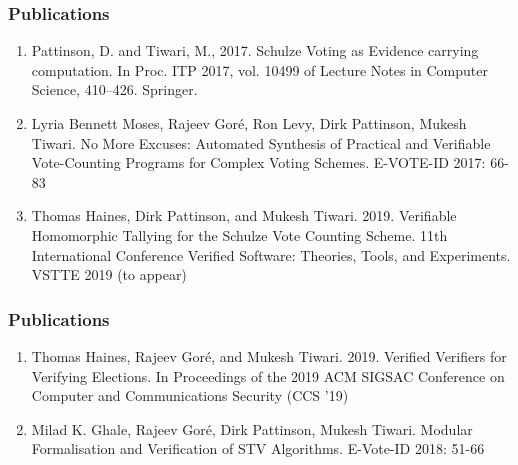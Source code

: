 \documentclass{beamer}
\begin{document}
\begin{frame}
\frametitle{Publications}
\begin{enumerate}
	\item Pattinson, D. and Tiwari, M., 2017. Schulze Voting as Evidence carrying computation. In Proc. 
	ITP 2017, vol. 10499 of Lecture Notes in Computer Science, 410–426. Springer. 
	\item Lyria Bennett Moses, Rajeev Goré, Ron Levy, Dirk Pattinson, Mukesh Tiwari.
	No More Excuses: Automated Synthesis of Practical and Verifiable Vote-Counting Programs for Complex 
	Voting 	Schemes. E-VOTE-ID 2017: 66-83
	\item Thomas Haines, Dirk Pattinson, and Mukesh Tiwari. 2019. 
	  Verifiable Homomorphic Tallying for the Schulze Vote Counting Scheme. 
	  11th International Conference Verified Software: Theories, Tools, and Experiments. 
      VSTTE 2019 (to appear)	
	\end{enumerate}
\end{frame}

\begin{frame}
\frametitle{Publications}
\begin{enumerate}
	 
	\item Thomas Haines, Rajeev Goré, and Mukesh Tiwari. 2019. Verified Verifiers for Verifying Elections. 
	 In Proceedings of the 2019 ACM SIGSAC Conference on Computer and Communications Security (CCS '19)
	 
	 \item Milad K. Ghale, Rajeev Goré, Dirk Pattinson, Mukesh Tiwari.
	Modular Formalisation and Verification of STV Algorithms. E-Vote-ID 2018: 51-66
	\end{enumerate}
\end{frame}
%
%
%
%
\end{document}
